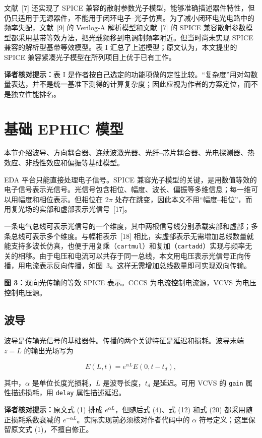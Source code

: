 \documentclass[11pt,a4paper]{ctexart}
\newcommand{\transnote}[1]{%
  \par\noindent\colorbox{yellow!16}{%
    \parbox{\dimexpr\linewidth-2\fboxsep}{\textbf{译者核对提示：}#1}}\par}
\begin{document}
文献~[7] 还实现了 SPICE 兼容的散射参数光子模型，能够准确描述器件特性，但仍只适用于无源器件，不能用于闭环电子--光子仿真。为了减小闭环电光电路中的频率失配，文献~[9] 的 Verilog-A 解析模型和文献~[7] 的 SPICE 兼容散射参数模型都采用基带等效方法，把光载频移到电调制频率附近。但当时尚未实现 SPICE 兼容的解析型基带等效模型。表 I 汇总了上述模型；原文认为，本文提出的 SPICE 兼容紧凑光子模型在所列项目上优于已有工作。

\transnote{表 I 是作者按自己选定的功能项做的定性比较。“复杂度”用对勾数量表达，并不是统一基准下测得的计算复杂度；因此应视为作者的方案定位，而不是独立性能排名。}

\section{基础 EPHIC 模型}

本节介绍波导、方向耦合器、连续波激光器、光纤--芯片耦合器、光电探测器、热效应、非线性效应和偏振等基础模型。

EDA 平台只能直接处理电子信号。SPICE 兼容光子模型的关键，是用数值等效的电子信号表示光信号。光信号包含相位、幅度、波长、偏振等多维信息；每一维可以用幅度和相位表示。但相位在 $2\pi$ 处存在跳变，因此本文不用“幅度--相位”，而用复光场的实部和虚部表示光信号~[17]。

一条电气总线可表示光信号的一个维度，其中两根信号线分别承载实部和虚部；多条总线可表示多个维度。与幅相表示~[18] 相比，实虚部表示无需增加总线数量就能支持多波长仿真，也便于用复乘（\texttt{cartmul}）和复加（\texttt{cartadd}）实现与频率无关的相移。由于电压和电流可以共存于同一总线，本文用电压表示光信号正向传播，用电流表示反向传播，如图~3。这样无需增加总线数量即可实现双向传输。

\noindent\textbf{图 3：}双向光传输的等效 SPICE 表示。CCCS 为电流控制电流源，VCVS 为电压控制电压源。

\subsection{波导}

波导是传输光信号的基础器件。传播的两个关键特征是延迟和损耗。波导末端 $z=L$ 的输出光场写为

\begin{equation}
E(L,t)=e^{\alpha L}E(0,t-t_d),
\tag{1}
\end{equation}

其中，$\alpha$ 是单位长度光损耗，$L$ 是波导长度，$t_d$ 是延迟。可用 VCVS 的 \texttt{gain} 属性描述损耗，用 \texttt{delay} 属性描述延迟。

\transnote{原文式 (1) 排成 $e^{\alpha L}$，但随后式 (4)、式 (12) 和式 (20) 都采用随正损耗系数衰减的 $e^{-\alpha L}$。实际实现前必须核对作者代码中的 $\alpha$ 符号定义；这里保留原文式 (1)，不擅自修正。}
\end{document}
